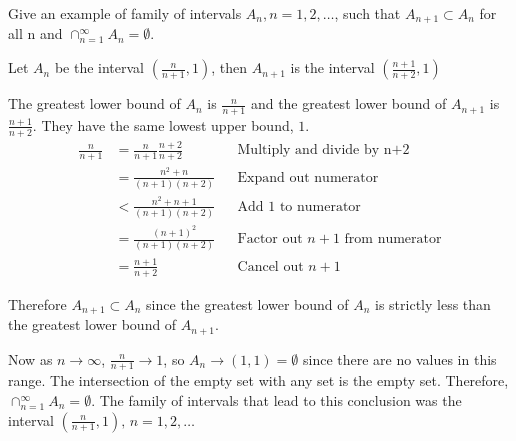 \documentclass[a4paper]{article}
\begin{document}
Give an example of family of intervals $A_n, n = 1,2,\dots$, such that $A_{n+1} \subset A_{n}$ for
all n and $\cap_{n=1}^{\infty}A_n = \emptyset$.

Let $A_n$ be the interval $(\frac{n}{n+1}, 1)$,
then $A_{n+1}$ is the interval $(\frac{n+1}{n+2}, 1)$

The greatest lower bound of $A_n$ is $\frac{n}{n+1}$ and the greatest lower bound of $A_{n+1}$ is
$\frac{n+1}{n+2}$. They have the same lowest upper bound, $1$.
\begin{align*}
  \frac{n}{n+1} &= \frac{n}{n+1}\frac{n+2}{n+2} && \text{Multiply and divide by n+2} \\
  &= \frac{n^2 + n}{(n+1)(n+2)} && \text{Expand out numerator} \\
  &< \frac{n^2 + n + 1}{(n+1)(n+2)} && \text{Add 1 to numerator} \\
  &= \frac{(n+1)^2}{(n+1)(n+2)} && \text{Factor out $n+1$ from numerator} \\
  &= \frac{n+1}{n+2} && \text{Cancel out $n+1$}
\end{align*}

Therefore $A_{n+1} \subset A_n$ since the greatest lower bound of $A_n$ is strictly less than the
greatest lower bound of $A_{n+1}$.

Now as $n \to \infty$, $\frac{n}{n+1} \to 1$, so $A_n \to (1, 1) = \emptyset$ since there are no values in this range. The
intersection of the empty set with any set is the empty set. Therefore, $\cap_{n=1}^{\infty}A_n =
\emptyset$. The family of intervals that lead to this conclusion was the interval $(\frac{n}{n+1},
1),\, n=1,2,\dots$
\end{document}
